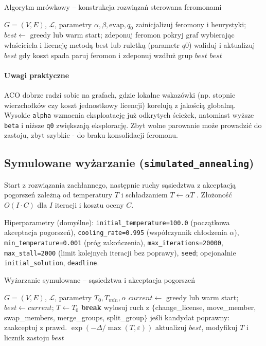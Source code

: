 \begin{algorithm}[H]
\caption{Algorytm mrówkowy -- konstrukcja rozwiązań sterowana feromonami}
\label{alg:aco}
\begin{algorithmic}[1]
\Require $G=(V,E)$, $\mathcal{L}$, parametry $\alpha,\beta,\text{evap},q_0$
\State zainicjalizuj feromony i heurystyki; $best\gets$ greedy lub warm start; zdeponuj feromon
    \State pokryj graf wybierając właściciela i licencję metodą best lub ruletką (parametr $q0$)
    \State waliduj i aktualizuj $best$ gdy koszt spada
  \EndFor
  \State paruj feromon i zdeponuj wzdłuż grup $best$
\EndFor
\State \Return $best$
\end{algorithmic}
\end{algorithm}

\paragraph{Uwagi praktyczne}
ACO dobrze radzi sobie na grafach, gdzie lokalne wskazówki (np. stopnie wierzchołków czy koszt jednostkowy licencji) korelują z jakością globalną. Wysokie \texttt{alpha} wzmacnia eksploatację już odkrytych ścieżek, natomiast wyższe \texttt{beta} i niższe \texttt{q0} zwiększają eksplorację. Zbyt wolne parowanie może prowadzić do zastoju, zbyt szybkie - do braku konsolidacji feromonu.

\subsection{Symulowane wyżarzanie (\texttt{simulated\_annealing})}\label{subsec:sa}
Start z rozwiązania zachłannego, następnie ruchy sąsiedztwa z akceptacją pogorszeń zależną od temperatury \(T\) i schładzaniem \(T\leftarrow \alpha T\) \cite{kirkpatrick1983}. Złożoność \(O(I\cdot C)\) dla \(I\) iteracji i kosztu oceny \(C\).

Hiperparametry (domyślne): \texttt{initial\_temperature=100.0} (początkowa akceptacja pogorszeń), \texttt{cooling\_rate=0.995} (współczynnik chłodzenia \(\alpha\)), \texttt{min\_temperature=0.001} (próg zakończenia), \texttt{max\_iterations=20000}, \texttt{max\_stall=2000} (limit kolejnych iteracji bez poprawy), \texttt{seed}; opcjonalnie \texttt{initial\_solution}, \texttt{deadline}.

\begin{algorithm}[H]
\caption{Wyżarzanie symulowane -- sąsiedztwa i akceptacja pogorszeń}
\label{alg:sa}
\begin{algorithmic}[1]
\Require $G=(V,E)$, $\mathcal{L}$, parametry $T_0, T_{min}, \alpha$
\State $current\gets$ greedy lub warm start; $best\gets current$; $T\gets T_0$
   \textbf{break} \EndIf
  \State wylosuj ruch z $\{$change\_license, move\_member, swap\_members, merge\_groups, split\_group$\}$
  \State jeśli kandydat poprawny: zaakceptuj z prawd. $\exp(-\Delta/\max(T,\varepsilon))$
  \State aktualizuj $best$, modyfikuj $T$ i licznik zastoju
\EndFor
\State \Return $best$
\end{algorithmic}
\end{algorithm}

